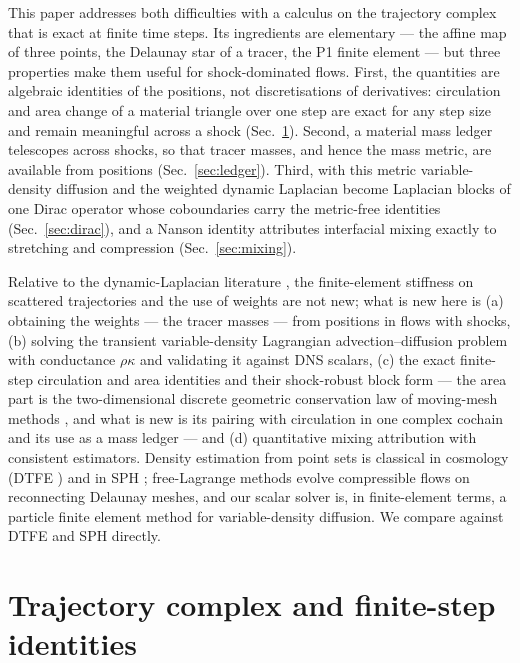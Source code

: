 \documentclass[11pt]{article}
\theoremstyle{definition}\newtheorem{definition}{Definition}\theoremstyle{remark}\newtheorem{remark}{Remark}
\begin{document}
This paper addresses both difficulties with a calculus on the trajectory complex that is exact at finite time steps. Its ingredients are elementary --- the affine map of three points, the Delaunay star of a tracer, the P1 finite element --- but three properties make them useful for shock-dominated flows. First, the quantities are algebraic identities of the positions, not discretisations of derivatives: circulation and area change of a material triangle over one step are exact for any step size and remain meaningful across a shock (Sec.~\ref{sec:identities}). Second, a material mass ledger telescopes across shocks, so that tracer masses, and hence the mass metric, are available from positions (Sec.~\ref{sec:ledger}). Third, with this metric variable-density diffusion and the weighted dynamic Laplacian become Laplacian blocks of one Dirac operator whose coboundaries carry the metric-free identities (Sec.~\ref{sec:dirac}), and a Nanson identity attributes interfacial mixing exactly to stretching and compression (Sec.~\ref{sec:mixing}).

Relative to the dynamic-Laplacian literature \citep{FroylandJunge2018,FroylandKwok2020,KarraschKeller2020}, the finite-element stiffness on scattered trajectories and the use of weights are not new; what is new here is (a) obtaining the weights --- the tracer masses --- from positions in flows with shocks, (b) solving the transient variable-density Lagrangian advection--diffusion problem with conductance $\rho\kappa$ and validating it against DNS scalars, (c) the exact finite-step circulation and area identities and their shock-robust block form --- the area part is the two-dimensional discrete geometric conservation law of moving-mesh methods \citep{ThomasLombard1979,Farhat2001}, and what is new is its pairing with circulation in one complex cochain and its use as a mass ledger --- and (d) quantitative mixing attribution with consistent estimators. Density estimation from point sets is classical in cosmology (DTFE \citep{Schaap2000}) and in SPH \citep{Monaghan2005}; free-Lagrange methods \citep{FreeLagrange1985} evolve compressible flows on reconnecting Delaunay meshes, and our scalar solver is, in finite-element terms, a particle finite element method \citep{Idelsohn2004} for variable-density diffusion. We compare against DTFE and SPH directly.

\section{Trajectory complex and finite-step identities}\label{sec:identities}
\end{document}
